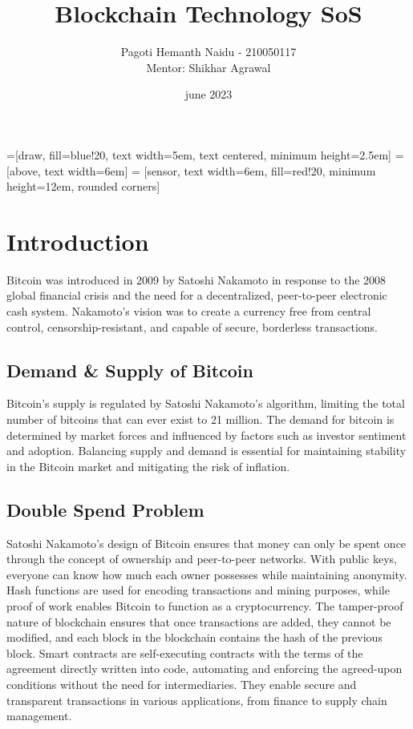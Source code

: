 \documentclass{article}
\title{Blockchain Technology SoS }
\author{Pagoti Hemanth Naidu - 210050117 \\
Mentor: Shikhar Agrawal}
\date{june 2023}
\begin{document}
=[draw, fill=blue!20, text width=5em, 
text centered, minimum height=2.5em]
 = [above, text width=6em]
 = [sensor, text width=6em, fill=red!20, 
minimum height=12em, rounded corners]
\def\blockdist{2.3}
\def\edgedist{1}
\maketitle
\tableofcontents
\newpage
\section{Introduction}

Bitcoin was introduced in 2009 by Satoshi Nakamoto in response to the 2008 global financial crisis and the need for a decentralized, peer-to-peer electronic cash system. 
Nakamoto's vision was to create a currency free from central control, censorship-resistant, and capable of secure, borderless transactions.
\subsection{Demand \& Supply of Bitcoin}
Bitcoin's supply is regulated by Satoshi Nakamoto's algorithm, limiting the total number of bitcoins that can ever exist to 21 million.
The demand for bitcoin is determined by market forces and influenced by factors such as investor sentiment and adoption. 
Balancing supply and demand is essential for maintaining stability in the Bitcoin market and mitigating the risk of inflation.
\subsection{Double Spend Problem}
Satoshi Nakamoto's design of Bitcoin ensures that money can only be spent once through the concept of ownership and peer-to-peer networks. With public keys, everyone can know how much each owner possesses while maintaining anonymity. 
Hash functions are used for encoding transactions and mining purposes, while proof of work enables Bitcoin to function as a cryptocurrency. 
The tamper-proof nature of blockchain ensures that once transactions are added, they cannot be modified, and each block in the blockchain contains the hash of the previous block.
Smart contracts are self-executing contracts with the terms of the agreement directly written into code, automating and enforcing the agreed-upon conditions without the need for intermediaries. 
They enable secure and transparent transactions in various applications, from finance to supply chain management.
\end{document}

